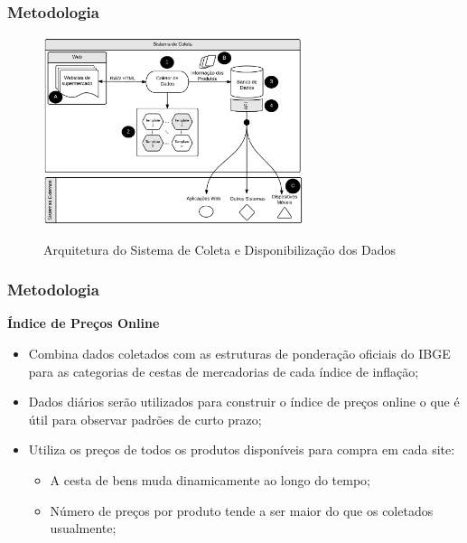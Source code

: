 \documentclass[aspectratio=169]{beamer}
\begin{document}
\begin{frame}\frametitle{Metodologia}
  \begin{figure}[hb]
  \includegraphics[width=3in]{WebScraping.png}
  \label{fig01en01}
  \caption{Arquitetura do Sistema de Coleta e Disponibilização dos Dados}
  \end{figure}
\end{frame}

\begin{frame}
\begin{centering}
\end{centering}
\end{frame}

\begin{frame}\frametitle{Metodologia}
  \textbf{Índice de Preços Online}
  \begin{itemize}
  \item Combina dados coletados com as estruturas de ponderação oficiais do IBGE para as categorias de cestas de mercadorias de cada índice de inflação;
  \item Dados diários serão utilizados para construir o índice de preços online o que é útil para observar padrões de curto prazo;
  \item Utiliza os preços de todos os produtos disponíveis para compra em cada site:
    \begin{itemize}
    \item A cesta de bens muda dinamicamente ao longo do tempo;
    \item Número de preços por produto tende a ser maior do que os coletados usualmente;
    \end{itemize}
  \end{itemize}
\end{frame}
\end{document}
